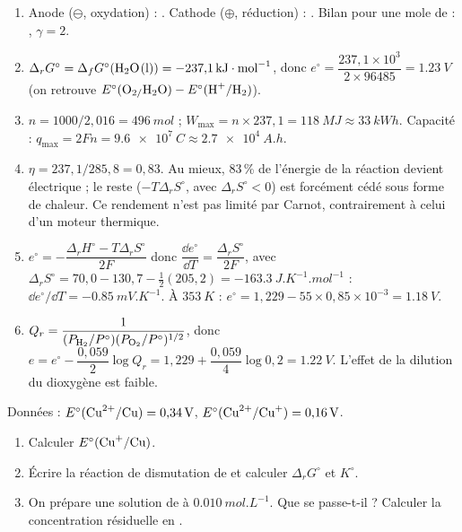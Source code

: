 \correction
\begin{enumerate}
  \item Anode ($\ominus$, oxydation) : . Cathode ($\oplus$, réduction) : . Bilan pour une mole de  : , $\gamma = 2$.
  \item $\Delta_rG^\circ = \Delta_fG^\circ(\ce{H2O(l)}) = \SI{-237,1}{kJ.mol^{-1}}$, donc $e^\circ = \dfrac{237{,}1\times10^3}{2\times96485} = \SI{1,23}{V}$ (on retrouve $E^\circ(\ce{O2/H2O}) - E^\circ(\ce{H+/H2})$).
  \item $n = 1000/2{,}016 = \SI{496}{mol}$ ; $W_{\max} = n\times237{,}1 = \SI{118}{MJ} \approx \SI{33}{kWh}$. Capacité : $q_{\max} = 2Fn = \SI{9,6e7}{C} \approx \SI{2,7e4}{A.h}$.
  \item $\eta = 237{,}1/285{,}8 = 0{,}83$. Au mieux, 83\,\% de l'énergie de la réaction devient électrique ; le reste ($-T\Delta_rS^\circ$, avec $\Delta_rS^\circ<0$) est forcément cédé sous forme de chaleur. Ce rendement n'est pas limité par Carnot, contrairement à celui d'un moteur thermique.
  \item $e^\circ = -\dfrac{\Delta_rH^\circ - T\Delta_rS^\circ}{2F}$ donc $\dfrac{\dd e^\circ}{\dd T} = \dfrac{\Delta_rS^\circ}{2F}$, avec $\Delta_rS^\circ = 70{,}0 - 130{,}7 - \tfrac12(205{,}2) = \SI{-163,3}{J.K^{-1}.mol^{-1}}$ : $\dd e^\circ/\dd T = \SI{-0,85}{mV.K^{-1}}$. À $\SI{353}{K}$ : $e^\circ = 1{,}229 - 55\times0{,}85\times10^{-3} = \SI{1,18}{V}$.
  \item $Q_r = \dfrac{1}{(P_{\ce{H2}}/P^\circ)(P_{\ce{O2}}/P^\circ)^{1/2}}$, donc $e = e^\circ - \dfrac{0{,}059}{2}\log Q_r = 1{,}229 + \dfrac{0{,}059}{4}\log 0{,}2 = \SI{1,22}{V}$. L'effet de la dilution du dioxygène est faible.
\end{enumerate}

\label{exo:cuivre}
Données : $E^\circ(\ce{Cu^{2+}/Cu}) = \SI{0,34}{V}$, $E^\circ(\ce{Cu^{2+}/Cu+}) = \SI{0,16}{V}$.
\begin{enumerate}
  \item Calculer $E^\circ(\ce{Cu+/Cu})$.
  \item Écrire la réaction de dismutation de  et calculer $\Delta_rG^\circ$ et $K^\circ$.
  \item On prépare une solution de  à $\SI{0,010}{mol.L^{-1}}$. Que se passe-t-il ? Calculer la concentration résiduelle en .
\end{enumerate}

